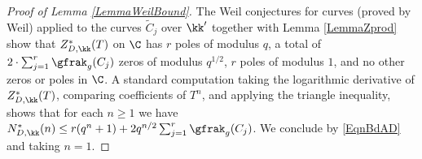 \begin{proof}[Proof of Lemma \ref{LemmaWeilBound}] The Weil conjectures for curves (proved by Weil) applied to the curves $\widetilde{C}_j$ over $\kk'$ together with Lemma \ref{LemmaZprod} show that $Z^*_{D,\kk}(T)$ on $\C$ has $r$ poles of modulus $q$, a total of $2\cdot \sum_{j=1}^r \gfrak_g(C_j)$ zeros of modulus $q^{1/2}$, $r$ poles of modulus $1$, and no other zeros or poles in $\C$. A standard computation taking the logarithmic derivative of $Z^*_{D,\kk}(T)$, comparing coefficients of $T^n$, and applying the triangle inequality, shows that for each $n\ge 1$ we have $N^*_{D,\kk}(n)\le r(q^n+1) + 2q^{n/2} \sum_{j=1}^r \gfrak_g(C_j)$. We conclude by \eqref{EqnBdAD} and taking $n=1$.
\end{proof}







